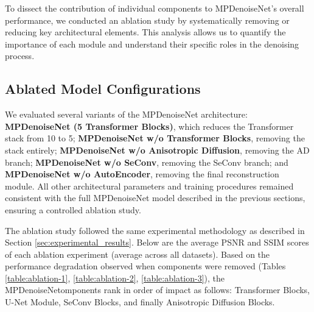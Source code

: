 To dissect the contribution of individual components to MPDenoiseNet's overall performance, we conducted an ablation study by systematically removing or reducing key architectural elements.  This analysis allows us to quantify the importance of each module and understand their specific roles in the denoising process.

\subsection{Ablated Model Configurations}

We evaluated several variants of the MPDenoiseNet architecture: \textbf{MPDenoiseNet (5 Transformer Blocks)}, which reduces the Transformer stack from 10 to 5; \textbf{MPDenoiseNet w/o Transformer Blocks}, removing the stack entirely; \textbf{MPDenoiseNet w/o Anisotropic Diffusion}, removing the AD branch; \textbf{MPDenoiseNet w/o SeConv}, removing the SeConv branch; and \textbf{MPDenoiseNet w/o AutoEncoder}, removing the final reconstruction module. All other architectural parameters and training procedures remained consistent with the full MPDenoiseNet model described in the previous sections, ensuring a controlled ablation study.

The ablation study followed the same experimental methodology as described in Section \ref{sec:experimental_results}. Below are the average PSNR and SSIM scores of each ablation experiment (average across all datasets). Based on the performance degradation observed when components were removed (Tables \ref{table:ablation-1}, \ref{table:ablation-2}, \ref{table:ablation-3}), the MPDenoiseNetomponents rank in order of impact as follows: Transformer Blocks, U-Net Module, SeConv Blocks, and finally Anisotropic Diffusion Blocks. 

